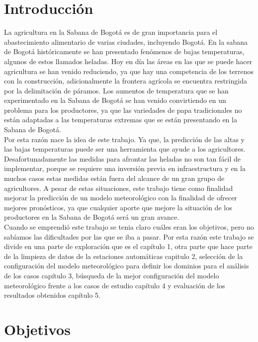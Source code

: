 \section{Introducción}

La agricultura en la Sabana de Bogotá es de gran importancia para el abastecimiento alimentario de varias ciudades, incluyendo Bogotá. En la sabana de Bogotá históricamente se han presentado fenómenos de bajas temperaturas, algunos de estos llamados heladas. Hoy en día las áreas en las que se puede hacer agricultura se han venido reduciendo, ya que hay una competencia de los terrenos con la construcción, adicionalmente la frontera agrícola se encuentra restringida por la delimitación de páramos. Los aumentos de temperatura que se han experimentado en la Sabana de Bogotá se han venido convirtiendo en un problema para los productores, ya que las variedades de papa tradicionales no están adaptadas a las temperaturas extremas que se están presentando en la Sabana de Bogotá.\\

Por esta razón nace la idea de este trabajo. Ya que, la predicción de las altas y las bajas temperaturas puede ser una herramienta que ayude a los agricultores. Desafortunadamente las medidas para afrontar las heladas no son tan fácil de implementar, porque se requiere una inversión previa en infraestructura y en la muchos casos estas medidas están fuera del alcance de un gran grupo de agricultores. A pesar de estas situaciones, este trabajo tiene como finalidad mejorar la predicción de un modelo meteorológico con la finalidad de ofrecer mejores pronósticos, ya que cualquier aporte que mejore la situación de los productores en la Sabana de Bogotá será un gran avance.\\

Cuando se emprendió este trabajo se tenia claro cuáles eran los objetivos, pero no sabíamos las dificultades por las que se iba a pasar. Por esta razón este trabajo se divide en una parte de exploración que es el capítulo 1, otra parte que hace parte de la limpieza de datos de la estaciones automáticas capitulo 2, selección de la configuración del modelo meteorológico para definir los dominios para el análisis de los casos capítulo 3, búsqueda de la mejor configuración del modelo meteorológico frente a los casos de estudio capítulo 4 y evaluación de los resultados obtenidos capítulo 5.\\



\section{Objetivos}

